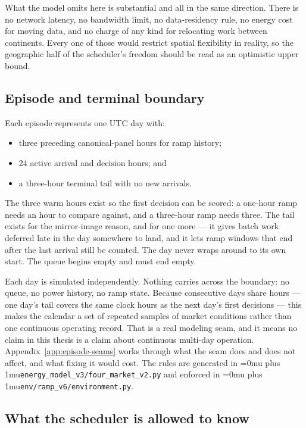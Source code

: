 ﻿\documentclass[12pt]{article}
\newcommand{\codepath}[1]{{\Urlmuskip=0mu plus 1mu\relax\nolinkurl{#1}}}
\begin{document}
What the model omits here is substantial and all in the same direction. There is
no network latency, no bandwidth limit, no data-residency rule, no energy cost
for moving data, and no charge of any kind for relocating work between
continents. Every one of those would restrict spatial flexibility in reality, so
the geographic half of the scheduler's freedom should be read as an optimistic
upper bound.

\subsection{Episode and terminal boundary}
\label{subsec:problem-episode}

Each episode represents one UTC day with:
\begin{itemize}
  \item three preceding canonical-panel hours for ramp history;
  \item 24 active arrival and decision hours; and
  \item a three-hour terminal tail with no new arrivals.
\end{itemize}

The three warm hours exist so the first decision can be scored: a one-hour ramp
needs an hour to compare against, and a three-hour ramp needs three. The tail
exists for the mirror-image reason, and for one more --- it gives batch work
deferred late in the day somewhere to land, and it lets ramp windows that end
after the last arrival still be counted. The day never wraps around to its own
start. The queue begins empty and must end empty.

Each day is simulated independently. Nothing carries across the boundary: no
queue, no power history, no ramp state. Because consecutive days share hours ---
one day's tail covers the same clock hours as the next day's first decisions ---
this makes the calendar a set of repeated samples of market conditions rather
than one continuous operating record. That is a real modeling seam, and it means
no claim in this thesis is a claim about continuous multi-day operation.
Appendix~\ref{app:episode-seams} works through what the seam does and does not
affect, and what fixing it would cost. The rules are generated in
\codepath{energy_model_v3/four_market_v2.py} and enforced in
\codepath{env/ramp_v6/environment.py}.

\subsection{What the scheduler is allowed to know}
\label{subsec:problem-causality}
\end{document}
